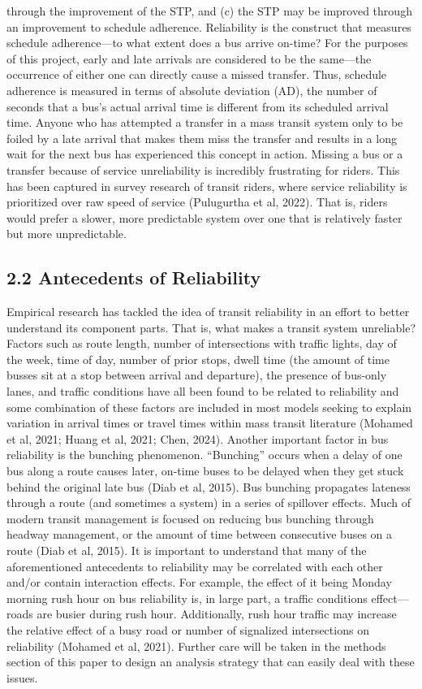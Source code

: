 \documentclass[
  12pt,
]{article}
\begin{document}
through the improvement of the STP, and (c) the STP may be improved
through an improvement to schedule adherence. Reliability is the
construct that measures schedule adherence---to what extent does a bus
arrive on-time? For the purposes of this project, early and late
arrivals are considered to be the same---the occurrence of either one
can directly cause a missed transfer. Thus, schedule adherence is
measured in terms of absolute deviation (AD), the number of seconds that
a bus's actual arrival time is different from its scheduled arrival
time. Anyone who has attempted a transfer in a mass transit system only
to be foiled by a late arrival that makes them miss the transfer and
results in a long wait for the next bus has experienced this concept in
action. Missing a bus or a transfer because of service unreliability is
incredibly frustrating for riders. This has been captured in survey
research of transit riders, where service reliability is prioritized
over raw speed of service (Pulugurtha et al, 2022). That is, riders
would prefer a slower, more predictable system over one that is
relatively faster but more unpredictable.

\subsection{2.2 Antecedents of
Reliability}\label{antecedents-of-reliability}

Empirical research has tackled the idea of transit reliability in an
effort to better understand its component parts. That is, what makes a
transit system unreliable? Factors such as route length, number of
intersections with traffic lights, day of the week, time of day, number
of prior stops, dwell time (the amount of time busses sit at a stop
between arrival and departure), the presence of bus-only lanes, and
traffic conditions have all been found to be related to reliability and
some combination of these factors are included in most models seeking to
explain variation in arrival times or travel times within mass transit
literature (Mohamed et al, 2021; Huang et al, 2021; Chen, 2024). Another
important factor in bus reliability is the bunching phenomenon.
``Bunching'' occurs when a delay of one bus along a route causes later,
on-time buses to be delayed when they get stuck behind the original late
bus (Diab et al, 2015). Bus bunching propagates lateness through a route
(and sometimes a system) in a series of spillover effects. Much of
modern transit management is focused on reducing bus bunching through
headway management, or the amount of time between consecutive buses on a
route (Diab et al, 2015). It is important to understand that many of the
aforementioned antecedents to reliability may be correlated with each
other and/or contain interaction effects. For example, the effect of it
being Monday morning rush hour on bus reliability is, in large part, a
traffic conditions effect---roads are busier during rush hour.
Additionally, rush hour traffic may increase the relative effect of a
busy road or number of signalized intersections on reliability (Mohamed
et al, 2021). Further care will be taken in the methods section of this
paper to design an analysis strategy that can easily deal with these
issues.
\end{document}
